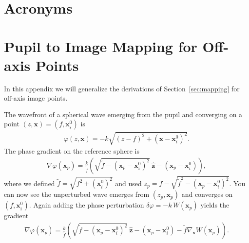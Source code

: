 \documentclass[TS,authoryear,toc]{lsstdoc}
\begin{document}
\section*{Acronyms} \label{sec:acronyms}



\newpage


\appendix

\section{Pupil to Image Mapping for Off-axis Points}

In this appendix we will generalize the derivations of Section~\ref{sec:mapping} for off-axis image points.

The wavefront of a spherical wave emerging from the pupil and converging on a point $(z, \mathbf{x}) = (f, \mathbf{x}_i^0)$ is
\begin{align}
    \varphi(z, \mathbf{x}) = -k \sqrt{(z - f)^2 + (\mathbf{x} - \mathbf{x}_i^0)^2}.
\end{align}
The phase gradient on the reference sphere is
\begin{align}
    \nabla \varphi(\mathbf{x}_p) = \frac{k}{\tilde{f}} \left(
        \sqrt{\tilde{f} - (\mathbf{x}_p - \mathbf{x}_i^0)^2} ~ \hat{\mathbf{z}} - (\mathbf{x}_p - \mathbf{x}_i^0)
    \right),
\end{align}
where we defined $\tilde{f} = \sqrt{f^2 + (\mathbf{x}_i^0)^2}$ and used $z_p = f - \sqrt{\tilde{f}^2 - (\mathbf{x}_p - \mathbf{x}_i^0)^2}$.
You can now see the unperturbed wave emerges from $(z_p, \mathbf{x}_p)$ and converges on $(f, \mathbf{x}_i^0)$.
Again adding the phase perturbation $\delta \varphi = -k \, W(\mathbf{x}_p)$ yields the gradient
\begin{align}
    \nabla \varphi(\mathbf{x}_p) = \frac{k}{\tilde{f}} \left(
        \sqrt{\tilde{f} - (\mathbf{x}_p - \mathbf{x}_i^0)^2} ~ \hat{\mathbf{z}} - (\mathbf{x}_p - \mathbf{x}_i^0) - \tilde{f} \nabla_\mathbf{x} W(\mathbf{x}_p)
    \right).
\end{align}
\end{document}
